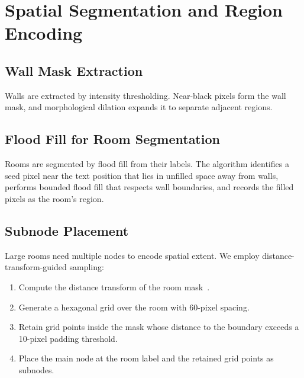 \documentclass[manuscript,screen,review]{acmart}
\begin{document}
\section{Spatial Segmentation and Region Encoding}
\label{sec:segmentation}

\subsection{Wall Mask Extraction}
\label{subsec:masks}

Walls are extracted by intensity thresholding. Near-black pixels form the wall mask, and morphological dilation expands it to separate adjacent regions. 

\subsection{Flood Fill for Room Segmentation}
\label{subsec:floodfill}

Rooms are segmented by flood fill from their labels. The algorithm identifies a seed pixel near the text position that lies in unfilled space away from walls, performs bounded flood fill that respects wall boundaries, and records the filled pixels as the room's region. 

\subsection{Subnode Placement}
\label{subsec:subnodes}

Large rooms need multiple nodes to encode spatial extent. We employ distance-transform-guided sampling:

\begin{enumerate}
    \item Compute the distance transform of the room mask~\cite{distance_transform}.
    \item Generate a hexagonal grid over the room with 60-pixel spacing.
    \item Retain grid points inside the mask whose distance to the boundary exceeds a 10-pixel padding threshold.
    \item Place the main node at the room label and the retained grid points as subnodes.
\end{enumerate}
\end{document}
